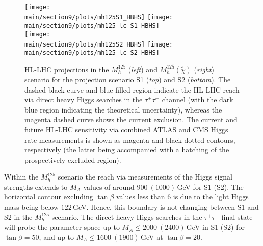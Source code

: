 \documentclass[../report.tex]{subfiles}
\providecommand{\main}{..}
\begin{document}
\begin{figure}
\begin{center}
\texttt{[image: \\main/section9/plots/mh125S1\_HBHS]}\hfill
\texttt{[image: \\main/section9/plots/mh125-lc\_S1\_HBHS]}\\
\texttt{[image: \\main/section9/plots/mh125S2\_HBHS]}\hfill
\texttt{[image: \\main/section9/plots/mh125-lc\_S2\_HBHS]}

\end{center}
\caption{HL-LHC projections in the $M_h^{125}$ (\emph{left}) and
  $M_h^{125}(\tilde{\chi})$ (\emph{right}) scenario for the projection scenario S1 (\emph{top}) and S2 (\emph{bottom}). The dashed black curve and blue filled region indicate the HL-LHC reach via direct heavy Higgs searches in the $\tau^+\tau^-$ channel (with the dark blue region indicating the theoretical uncertainty), whereas the magenta dashed curve shows the current exclusion. The current and future HL-LHC sensitivity via  combined ATLAS and CMS Higgs rate measurements is shown as magenta and black dotted contours, respectively (the latter being accompanied with a hatching of the prospectively excluded region).}
\label{fig:bench}
\end{figure}

Within the $M_h^{125}$ scenario the reach via measurements of the Higgs signal strengths extends to $M_A$ values of around $900~(1000)$\,GeV for S1 (S2). The horizontal contour excluding $\tan\beta$ values less than 6 is due to the light Higgs mass being below $122$\,GeV. Hence, this boundary is not changing between S1 and S2 in the $M_h^{125}$ scenario. The direct heavy Higgs searches in the $\tau^+\tau^-$ final state will probe the parameter space up to $M_A \le 2000~(2400)$\,GeV in S1 (S2) for $\tan\beta = 50$, and up to $M_A \le 1600~(1900)$\,GeV at $\tan\beta = 20$. 
\end{document}
